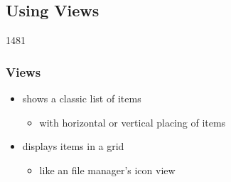 %
%
%
%

\subsection{Using Views}

\begin{slide}{1481}\frametitle{Views}

\begin{itemize}
\item {} shows a classic list of items
  \begin{itemize}
  \item with horizontal or vertical placing of items
  \end{itemize}
\item {} displays items in a grid
  \begin{itemize}
  \item like an file manager's icon view
  \end{itemize}
\end{itemize}

\end{slide}


